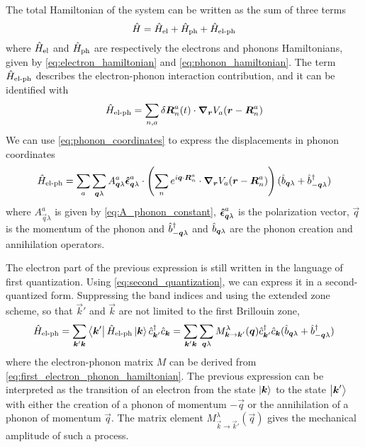 The total Hamiltonian of the system can be written as the sum of three terms
\begin{equation}
    \hat{H} = \hat{H}_\text{el} + \hat{H}_\text{ph} + \hat{H}_\text{el-ph}
\end{equation}
where $\hat{H}_\text{el}$ and $\hat{H}_\text{ph}$ are respectively the electrons and phonons Hamiltonians, given by \cref{eq:electron_hamiltonian} and \cref{eq:phonon_hamiltonian}. The  term  $\hat{H}_\text{el-ph}$ describes the  electron-phonon interaction contribution, and it can be identified with
\begin{equation}
    \hat{H}_\text{el-ph} = \sum_{n,a} \delta \mathbf{\boldsymbol{R}}_n^a(t) \cdot \grad_{\mathbf{\boldsymbol{r}}} V_a(\mathbf{\boldsymbol{r}} - \mathbf{\boldsymbol{R}}_n^a)
\end{equation}
We can use \cref{eq:phonon_coordinates} to express the displacements in phonon coordinates
\begin{equation} \label{eq:first_electron_phonon_hamiltonian}
    \hat{H}_\text{el-ph} = \sum_{a} \sum_{\mathbf{\boldsymbol{q}}\lambda} A_{\mathbf{\boldsymbol{q}}\lambda}^a \mathbf{\boldsymbol{\hat{\epsilon}}}_{\mathbf{\boldsymbol{q}}\lambda}^a \cdot \left( \sum_n e^{i\mathbf{\boldsymbol{q}} \cdot \mathbf{\boldsymbol{R}}_n^a}   \cdot \grad_{\mathbf{\boldsymbol{r}}} V_a(\mathbf{\boldsymbol{r}} - \mathbf{\boldsymbol{R}}_n^a) \right) (\hat{b}_{\mathbf{\boldsymbol{q}}\lambda} + \hat{b}^\dagger_{-\mathbf{\boldsymbol{q}}\lambda})
\end{equation}
where $A_{\vec{q}\lambda}^a$ is given by \cref{eq:A_phonon_constant}, $\mathbf{\boldsymbol{\hat{\epsilon}}}_{\mathbf{\boldsymbol{q}}\lambda}^a$ is the polarization vector, $\vec{q}$ is the momentum of the phonon and $\hat{b}^\dagger_{-\mathbf{\boldsymbol{q}}\lambda}$ and $\hat{b}_{\mathbf{\boldsymbol{q}}\lambda}$ are the phonon creation and annihilation operators.

The electron part of the previous expression is still written in the language of first quantization. Using \cref{eq:second_quantization}, we can express it in a second-quantized form. Suppressing the band indices and using the extended zone scheme, so that $\vec{k}'$ and $\vec{k}$ are not limited to the first Brillouin zone,
\begin{equation} \label{eq:general_electron_phonon_hamiltonian}
    \hat{H}_\text{el-ph} = \sum_{\mathbf{\boldsymbol{k}}'\mathbf{\boldsymbol{k}}} \bra{\mathbf{\boldsymbol{k}}'} \hat{H}_\text{el-ph} \ket{\mathbf{\boldsymbol{k}}} \hat{c}^\dagger_{\mathbf{\boldsymbol{k}}'}\hat{c}_{\mathbf{\boldsymbol{k}}}
    = \sum_{\mathbf{\boldsymbol{k}}'\mathbf{\boldsymbol{k}}} \sum_{\mathbf{\boldsymbol{q}}\lambda} M_{\mathbf{\boldsymbol{k}} \rightarrow \mathbf{\boldsymbol{k}}'}^\lambda(\mathbf{\boldsymbol{q}}) \hat{c}^\dagger_{\mathbf{\boldsymbol{k}}'}\hat{c}_{\mathbf{\boldsymbol{k}}} (\hat{b}_{\mathbf{\boldsymbol{q}}\lambda} + \hat{b}^\dagger_{-\mathbf{\boldsymbol{q}}\lambda})
\end{equation}
where the electron-phonon matrix $M$ can be derived from \cref{eq:first_electron_phonon_hamiltonian}. The previous expression can be interpreted as the transition of an electron from the state $\ket{\mathbf{\boldsymbol{k}}}$ to the state $\ket{\mathbf{\boldsymbol{k}}'}$ with either the creation of a phonon of momentum $-\vec{q}$ or the annihilation of a phonon of momentum $\vec{q}$. The matrix element $M_{\vec{k} \rightarrow \vec{k}'}^\lambda(\vec{q})$ gives the mechanical amplitude of such a process.

